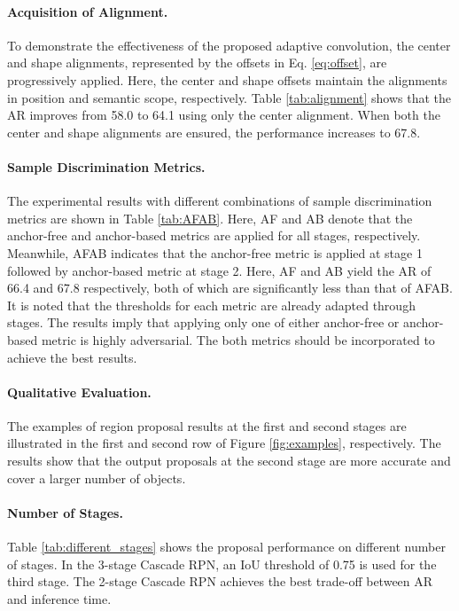 \documentclass{article}
\begin{document}
	\paragraph{Acquisition of Alignment. } To demonstrate the effectiveness of the proposed adaptive convolution, the center and shape alignments, represented by the offsets in Eq. \eqref{eq:offset}, are progressively applied. Here, the center and shape offsets maintain the alignments in position and semantic scope, respectively. Table \ref{tab:alignment} shows that the AR improves from 58.0 to 64.1 using only the center alignment. When both the center and shape alignments are ensured, the performance increases to 67.8.
	
	\paragraph{Sample Discrimination Metrics. } The experimental results with different combinations of sample discrimination metrics are shown in Table \ref{tab:AFAB}. Here, AF and AB denote that the anchor-free and anchor-based metrics are applied for all stages, respectively.  Meanwhile, AFAB indicates that the anchor-free metric is applied at stage 1 followed by anchor-based metric at stage 2. Here, AF and AB yield the AR of 66.4 and 67.8 respectively, both of which are significantly less than that of AFAB. It is noted that the thresholds for each metric are already adapted through stages. The results imply that applying only one of either anchor-free or anchor-based metric is highly adversarial. The both metrics should be incorporated to achieve the best results.
	
	\paragraph{Qualitative Evaluation.} The examples of region proposal results at the first and second stages are illustrated in the first and second row of Figure \ref{fig:examples}, respectively. The results show that the output proposals at the second stage are more accurate and cover a larger number of objects. 
	
	
	\paragraph{Number of Stages.} Table \ref{tab:different_stages} shows the proposal performance on different number of stages. In the 3-stage Cascade RPN, an IoU threshold of 0.75 is used for the third stage. The 2-stage Cascade RPN achieves the best trade-off between AR and inference time. 
	
\end{document}
